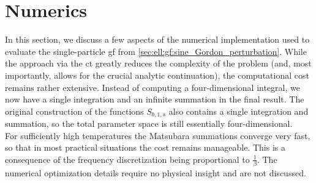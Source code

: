 \section{Numerics}\label{sec:app:numerics}
In this section, we discuss a few aspects of the numerical implementation used to evaluate the single-particle \gls{gf} from \autoref{sec:ell:gf:sine_Gordon_perturbation}.
While the approach via the \gls{ct} greatly reduces the complexity of the problem (and, most importantly, allows for the crucial analytic continuation), the computational cost remains rather extensive.
Instead of computing a four-dimensional integral, we now have a single integration and an infinite summation in the final result.
The original construction of the functions $S_{b,1,s}$ also contains a single integration and summation, so the total parameter space is still essentially four-dimensional.\\
For sufficiently high temperatures the Matsubara summations converge very fast, so that in most practical situations the cost remains manageable.
This is a consequence of the frequency discretization being proportional to $\frac{1}{\beta}$.
The numerical optimization details require no physical insight and are not discussed.
